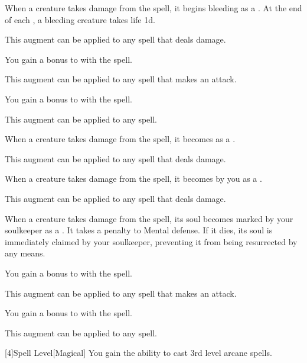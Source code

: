 {            %
             When a creature takes damage from the spell, it begins bleeding as a .
            At the end of each , a bleeding creature takes life  \minus1d.
            \par This augment can be applied to any spell that deals damage.

             You gain a  bonus to  with the spell.
            \par This augment can be applied to any spell that makes an attack.

             You gain a  bonus to  with the spell.
            \par This augment can be applied to any spell.

             When a creature takes damage from the spell, it becomes  as a .
            \par This augment can be applied to any spell that deals damage.

             When a creature takes damage from the spell, it becomes  by you as a .
            \par This augment can be applied to any spell that deals damage.

             When a creature takes damage from the spell, its soul becomes marked by your soulkeeper as a .
            It takes a  penalty to Mental defense.
            If it dies, its soul is immediately claimed by your soulkeeper, preventing it from being resurrected by any means.

             You gain a  bonus to  with the spell.
            \par This augment can be applied to any spell that makes an attack.

             You gain a  bonus to  with the spell.
            \par This augment can be applied to any spell.
        }

        [4]{Spell Level}[Magical] You gain the ability to cast 3rd level arcane spells.

